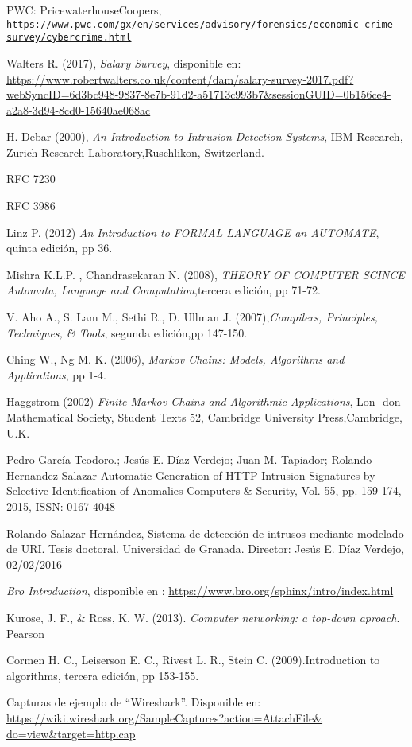 \begin{thebibliography}{99}
PWC: PricewaterhouseCoopers,
\\\texttt{\url{https://www.pwc.com/gx/en/services/advisory/forensics/economic-crime-survey/cybercrime.html}}

Walters R. (2017), \textit{Salary Survey}, disponible en: \url{https://www.robertwalters.co.uk/content/dam/salary-survey-2017.pdf?webSyncID=6d3bc948-9837-8e7b-91d2-a51713c993b7&sessionGUID=0b156ce4-a2a8-3d94-8cd0-15640ae068ac}

H.   Debar (2000), \textit{An Introduction to Intrusion-Detection Systems},  IBM   Research,   Zurich   Research   Laboratory,Ruschlikon, Switzerland.

RFC 7230

RFC 3986

Linz P. (2012) \textit{An Introduction to FORMAL LANGUAGE an AUTOMATE}, quinta edición, pp 36.

Mishra K.L.P. , Chandrasekaran N. (2008), \textit{THEORY OF COMPUTER SCINCE Automata, Language and Computation},tercera edición, pp 71-72.

V. Aho A., S. Lam M., Sethi R., D. Ullman J. (2007),\textit{Compilers, Principles, Techniques, \& Tools}, segunda edición,pp 147-150.

Ching W., Ng M. K. (2006), \textit{Markov Chains: Models, Algorithms and Applications}, pp 1-4.

Haggstrom (2002) \textit{Finite Markov Chains and Algorithmic Applications}, Lon-
don Mathematical Society, Student Texts 52, Cambridge University Press,Cambridge, U.K.

Pedro García-Teodoro.; Jesús E. Díaz-Verdejo; Juan M. Tapiador; Rolando Hernandez-Salazar
Automatic Generation of HTTP Intrusion Signatures by Selective Identification of Anomalies
Computers \& Security, Vol. 55, pp. 159-174, 2015, ISSN: 0167-4048 

Rolando Salazar Hernández, Sistema de detección de intrusos mediante modelado de URI. Tesis doctoral. Universidad de Granada. Director: Jesús E. Díaz Verdejo, 02/02/2016

\textit{Bro Introduction}, disponible en : \url{https://www.bro.org/sphinx/intro/index.html}

Kurose, J. F., \& Ross, K. W. (2013). \textit{Computer networking: a top-down aproach}. Pearson

 Cormen H. C., Leiserson E. C., Rivest L. R., Stein C. (2009).Introduction to algorithms, tercera edición, pp 153-155.

 Capturas de ejemplo de “Wireshark”. Disponible en:  \url{https://wiki.wireshark.org/SampleCaptures?action=AttachFile&
do=view&target=http.cap}

\end{thebibliography}